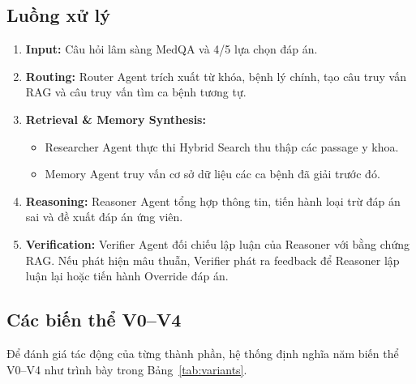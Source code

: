 \subsection{Luồng xử lý}
\begin{enumerate}
    \item \textbf{Input:} Câu hỏi lâm sàng MedQA và 4/5 lựa chọn đáp án.
    \item \textbf{Routing:} Router Agent trích xuất từ khóa, bệnh lý chính, tạo câu truy vấn RAG và câu truy vấn tìm ca bệnh tương tự.
    \item \textbf{Retrieval \& Memory Synthesis:}
    \begin{itemize}
        \item Researcher Agent thực thi Hybrid Search thu thập các passage y khoa.
        \item Memory Agent truy vấn cơ sở dữ liệu các ca bệnh đã giải trước đó.
    \end{itemize}
    \item \textbf{Reasoning:} Reasoner Agent tổng hợp thông tin, tiến hành loại trừ đáp án sai và đề xuất đáp án ứng viên.
    \item \textbf{Verification:} Verifier Agent đối chiếu lập luận của Reasoner với bằng chứng RAG. Nếu phát hiện mâu thuẫn, Verifier phát ra feedback để Reasoner lập luận lại hoặc tiến hành Override đáp án.
\end{enumerate}

\subsection{Các biến thể V0--V4}

Để đánh giá tác động của từng thành phần, hệ thống định nghĩa năm
biến thể V0--V4 như trình bày trong Bảng~\ref{tab:variants}.

